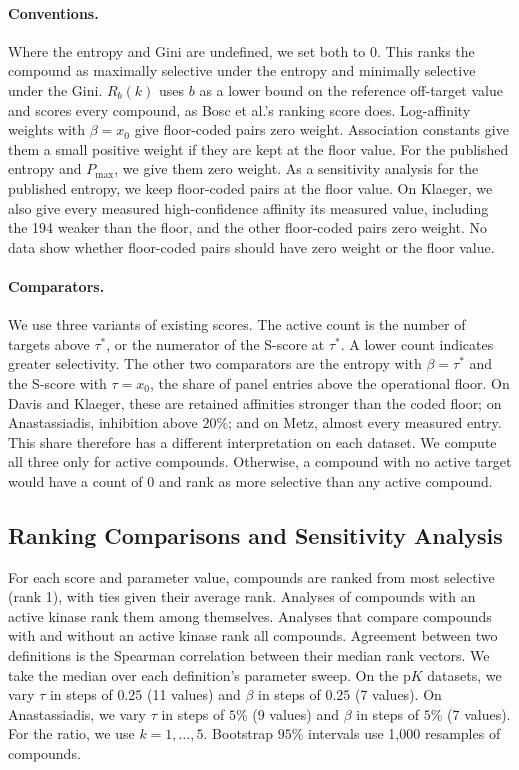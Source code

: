 \paragraph{Conventions.} Where the entropy and Gini are undefined, we set both
to $0$. This ranks the compound as maximally selective under the entropy and
minimally selective under the Gini. $R_b(k)$ uses $b$ as a lower bound on
the reference off-target value and scores every compound, as Bosc et al.'s
ranking score does.
Log-affinity weights with $\beta = x_0$ give floor-coded pairs zero weight.
Association constants give them a small positive weight if they are kept at the
floor value. For the published entropy and $P_{\max}$, we give them zero weight.
As a sensitivity analysis for the published entropy, we keep floor-coded
pairs at the floor value. On Klaeger, we also give every measured
high-confidence affinity its measured value, including the 194 weaker than
the floor, and the other floor-coded pairs zero weight. No data show whether
floor-coded pairs should have zero weight or the floor value.

\paragraph{Comparators.} We use three variants of existing scores. The active
count is the number of targets above $\tau^*$, or the numerator of the S-score
at $\tau^*$. A lower count indicates greater selectivity. The other two
comparators are the entropy with $\beta = \tau^*$ and the S-score with
$\tau = x_0$, the share of panel entries above the operational floor.
On Davis and Klaeger, these are retained affinities stronger than the coded
floor; on Anastassiadis, inhibition above $20\%$; and on Metz, almost every
measured entry. This share therefore has a different interpretation on each
dataset. We compute all
three only for active compounds. Otherwise, a compound with no active target
would have a count of 0 and rank as more selective than any active compound.

\subsection{Ranking Comparisons and Sensitivity Analysis}
\label{sec:methods:stability}

For each score and parameter value, compounds are ranked from most selective
(rank 1), with ties given their average rank. Analyses of compounds with an
active kinase rank them among themselves. Analyses that compare
compounds with and without an active kinase rank all compounds. Agreement
between two definitions is the Spearman correlation between their median
rank vectors. We take the median over each definition's parameter sweep.
On the $\mathrm{p}K$ datasets, we vary $\tau$ in steps of $0.25$ (11 values)
and $\beta$ in steps of $0.25$ (7 values). On Anastassiadis, we vary $\tau$
in steps of $5\%$ (9 values) and $\beta$ in steps of $5\%$ (7 values).
For the ratio, we use $k = 1, \ldots, 5$. Bootstrap
$95\%$ intervals use 1{,}000 resamples of compounds.

